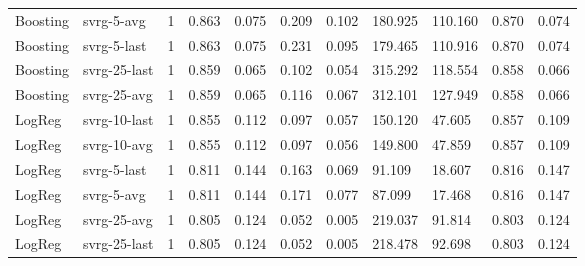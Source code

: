 \documentclass[margin={10pt 10pt 10pt 10pt}]{standalone}
\begin{document}
\begin{tabular}{lllllllllll}
    Boosting & svrg-5-avg & 1 & 0.863 & 0.075 & 0.209 & 0.102 & 180.925 & 110.160 & 0.870 & 0.074 \\
    Boosting & svrg-5-last & 1 & 0.863 & 0.075 & 0.231 & 0.095 & 179.465 & 110.916 & 0.870 & 0.074 \\
    Boosting & svrg-25-last & 1 & 0.859 & 0.065 & 0.102 & 0.054 & 315.292 & 118.554 & 0.858 & 0.066 \\
    Boosting & svrg-25-avg & 1 & 0.859 & 0.065 & 0.116 & 0.067 & 312.101 & 127.949 & 0.858 & 0.066 \\
    LogReg & svrg-10-last & 1 & 0.855 & 0.112 & 0.097 & 0.057 & 150.120 & 47.605 & 0.857 & 0.109 \\
    LogReg & svrg-10-avg & 1 & 0.855 & 0.112 & 0.097 & 0.056 & 149.800 & 47.859 & 0.857 & 0.109 \\
    LogReg & svrg-5-last & 1 & 0.811 & 0.144 & 0.163 & 0.069 & 91.109 & 18.607 & 0.816 & 0.147 \\
    LogReg & svrg-5-avg & 1 & 0.811 & 0.144 & 0.171 & 0.077 & 87.099 & 17.468 & 0.816 & 0.147 \\
    LogReg & svrg-25-avg & 1 & 0.805 & 0.124 & 0.052 & 0.005 & 219.037 & 91.814 & 0.803 & 0.124 \\
    LogReg & svrg-25-last & 1 & 0.805 & 0.124 & 0.052 & 0.005 & 218.478 & 92.698 & 0.803 & 0.124 \\
    \bottomrule
\end{tabular}
\end{document}
